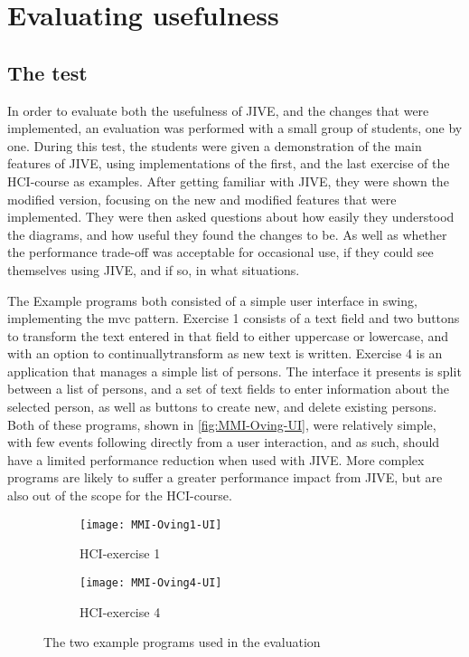 \chapter{Evaluating usefulness}\label{jiveEval}
\section{The test}\label{jiveEvalTest}%
In order to evaluate both the usefulness of JIVE, and the changes that were implemented, an evaluation was performed with a small group of students, one by one.
During this test, the students were given a demonstration of the main features of JIVE, using implementations of the first, and the last exercise of the HCI-course as examples.
After getting familiar with JIVE, they were shown the modified version, focusing on the new and modified features that were implemented.
They were then asked questions about how easily they understood the diagrams, and how useful they found the changes to be.
As well as whether the performance trade-off was acceptable for occasional use, if they could see themselves using JIVE, and if so, in what situations.

The Example programs both consisted of a simple user interface in swing, implementing the \gls{mvc} pattern.
Exercise 1 consists of a text field and two buttons to transform the text entered in that field to either uppercase or lowercase, and with an option to continuallytransform as new text is written.
Exercise 4 is an application that manages a simple list of persons.
The interface it presents is split between a list of persons, and a set of text fields to enter information about the selected person, as well as buttons to create new, and delete existing persons.
Both of these programs, shown in \autoref{fig:MMI-Oving-UI}, were relatively simple, with few events following directly from a user interaction, and as such, should have a limited performance reduction when used with JIVE.
More complex programs are likely to suffer a greater performance impact from JIVE, but are also out of the scope for the HCI-course.


\begin{figure}[H]
	\centering
	\begin{subfigure}{\textwidth}
		\centering
		\texttt{[image: MMI-Oving1-UI]}
		\caption{HCI-exercise 1}
		\label{fig:MMI-Oving1-UI}
	\end{subfigure}
	\begin{subfigure}{\textwidth}
		\centering
		\texttt{[image: MMI-Oving4-UI]}
		\caption{HCI-exercise 4}
		\label{fig:MMI-Oving4-UI}
	\end{subfigure}
	\caption{The two example programs used in the evaluation}
	\label{fig:MMI-Oving-UI}
\end{figure}

